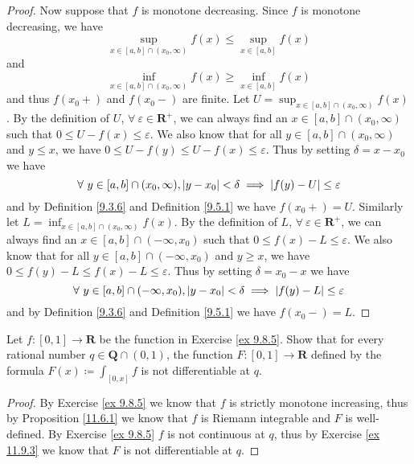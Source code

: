 \begin{proof}
    Now suppose that \(f\) is monotone decreasing.
    Since \(f\) is monotone decreasing, we have
    \[
        \sup_{x \in [a, b] \cap (x_0, \infty)} f(x) \leq \sup_{x \in [a, b]} f(x)
    \]
    and
    \[
        \inf_{x \in [a, b] \cap (x_0, \infty)} f(x) \geq \inf_{x \in [a, b]} f(x)
    \]
    and thus \(f(x_0+)\) and \(f(x_0-)\) are finite.
    Let \(U = \sup_{x \in [a, b] \cap (x_0, \infty)} f(x)\).
    By the definition of \(U\), \(\forall\ \varepsilon \in \mathbf{R}^+\), we can always find an \(x \in [a, b] \cap (x_0, \infty)\) such that \(0 \leq U - f(x) \leq \varepsilon\).
    We also know that for all \(y \in [a, b] \cap (x_0, \infty)\) and \(y \leq x\), we have \(0 \leq U - f(y) \leq U - f(x) \leq \varepsilon\).
    Thus by setting \(\delta = x - x_0\) we have
    \[
        \forall\ y \in [a, b] \cap (x_0, \infty), \abs*{y - x_0} < \delta \implies \abs*{f(y) - U} \leq \varepsilon
    \]
    and by Definition \ref{9.3.6} and Definition \ref{9.5.1} we have \(f(x_0+) = U\).
    Similarly let \(L = \inf_{x \in [a, b] \cap (x_0, \infty)} f(x)\).
    By the definition of \(L\), \(\forall\ \varepsilon \in \mathbf{R}^+\), we can always find an \(x \in [a, b] \cap (-\infty, x_0)\) such that \(0 \leq f(x) - L \leq \varepsilon\).
    We also know that for all \(y \in [a, b] \cap (-\infty, x_0)\) and \(y \geq x\), we have \(0 \leq f(y) - L \leq f(x) - L \leq \varepsilon\).
    Thus by setting \(\delta = x_0 - x\) we have
    \[
        \forall\ y \in [a, b] \cap (-\infty, x_0), \abs*{y - x_0} < \delta \implies \abs*{f(y) - L} \leq \varepsilon
    \]
    and by Definition \ref{9.3.6} and Definition \ref{9.5.1} we have \(f(x_0-) = L\).
\end{proof}

\exercisesection

\begin{exercise}\label{ex 11.9.1}
    Let \(f : [0, 1] \to \mathbf{R}\) be the function in Exercise \ref{ex 9.8.5}.
    Show that for every rational number \(q \in \mathbf{Q} \cap (0, 1)\), the function \(F : [0, 1] \to \mathbf{R}\) defined by the formula \(F(x) \coloneqq \int_{[0, x]} f\) is not differentiable at \(q\).
\end{exercise}

\begin{proof}
    By Exercise \ref{ex 9.8.5} we know that \(f\) is strictly monotone increasing, thus by Proposition \ref{11.6.1} we know that \(f\) is Riemann integrable and \(F\) is well-defined.
    By Exercise \ref{ex 9.8.5} \(f\) is not continuous at \(q\), thus by Exercise \ref{ex 11.9.3} we know that \(F\) is not differentiable at \(q\).
\end{proof}

